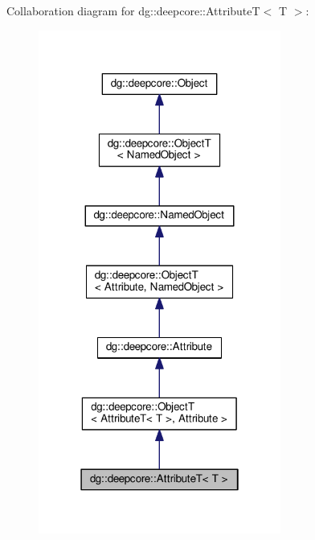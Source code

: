 Collaboration diagram for dg\+:\+:deepcore\+:\+:AttributeT$<$ T $>$\+:
\nopagebreak
\begin{figure}[H]
\begin{center}
\leavevmode
\includegraphics[width=226pt]{structdg_1_1deepcore_1_1_attribute_t__coll__graph}
\end{center}
\end{figure}
